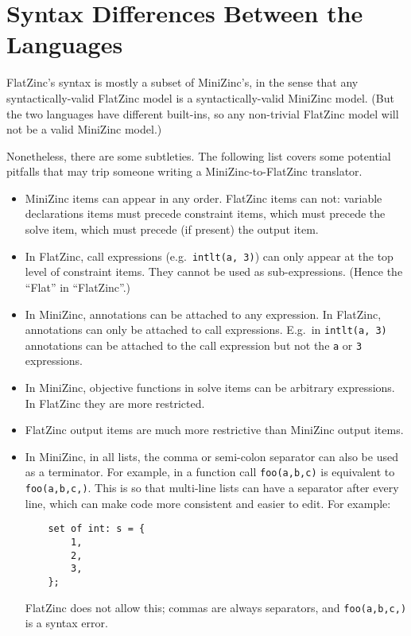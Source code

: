 \documentclass[10pt]{article}
\newcommand{\n}{\symbol{95}}
\begin{document}
\section{Syntax Differences Between the Languages}
  \label{Syntax}
FlatZinc's syntax is mostly a subset of MiniZinc's, in the sense that any
syntactically-valid FlatZinc model is a syntactically-valid MiniZinc model.
(But the two languages have different built-ins, so any non-trivial FlatZinc
model will not be a valid MiniZinc model.)

Nonetheless, there are some subtleties.  The following list covers some
potential pitfalls that may trip someone writing a MiniZinc-to-FlatZinc
translator.

\begin{itemize}
\item MiniZinc items can appear in any order.  FlatZinc items can not:
      variable declarations items must precede constraint items, which must
      precede the solve item, which must precede (if present) the output
      item.

\item In FlatZinc, call expressions (e.g.~\texttt{int\n{}lt(a, 3)}) can only
      appear at the top level of constraint items.  They cannot be used as
      sub-expressions.  (Hence the ``Flat'' in ``FlatZinc''.)

\item In MiniZinc, annotations can be attached to any expression.  In
      FlatZinc, annotations can only be attached to call expressions.
      E.g.~in \texttt{int\n{}lt(a, 3)} annotations can be attached to
      the call expression but not the \texttt{a} or \texttt{3} expressions.

\item In MiniZinc, objective functions in solve items can be arbitrary
      expressions.  In FlatZinc they are more restricted.

\item FlatZinc output items are much more restrictive than MiniZinc output
      items.

\item In MiniZinc, in all lists, the comma or semi-colon separator can also
      be used as a terminator.  For example, in a function call
      \texttt{foo(a,b,c)} is equivalent to \texttt{foo(a,b,c,)}.  This is so
      that multi-line lists can have a separator after every line, which
      can make code more consistent and easier to edit.  For example:
\begin{verbatim}
    set of int: s = {
        1,
        2,
        3,
    };
\end{verbatim}
      FlatZinc does not allow this;  commas are always separators, and
      \texttt{foo(a,b,c,)} is a syntax error.
\end{itemize}
\end{document}
